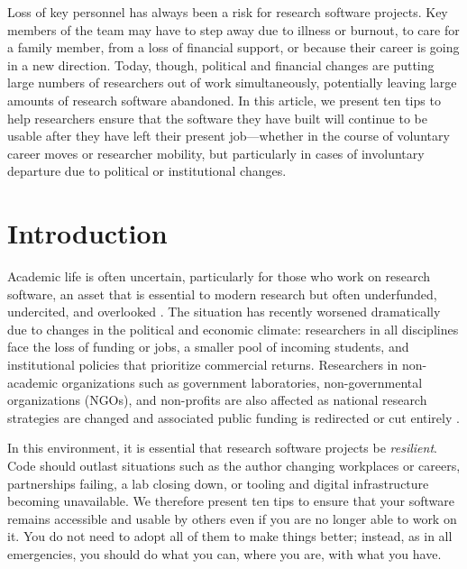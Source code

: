 \documentclass[10pt,letterpaper]{article}
\begin{document}
Loss of key personnel has always been a risk for research software projects.
Key members of the team may have to step away due to illness or burnout,
to care for a family member,
from a loss of financial support,
or because their career is going in a new direction.
Today,
though,
political and financial changes are putting large numbers of researchers out of work simultaneously,
potentially leaving large amounts of research software abandoned.
In this article,
we present ten tips to help researchers ensure that
the software they have built will continue to be usable
after they have left their present job---whether in the course of voluntary career moves or researcher mobility,
but particularly in cases of involuntary departure due to political or institutional changes.

\linenumbers

\section*{Introduction}

Academic life is often uncertain,
particularly for those who work on research software,
an asset that is essential to modern research \cite{Pearson2025}
but often underfunded, undercited, and overlooked \cite{Carver2022}.
The situation has recently worsened dramatically due to changes in the political and economic climate:
researchers in all disciplines face the loss of funding or jobs,
a smaller pool of incoming students,
and institutional policies that prioritize commercial returns.
Researchers in non-academic organizations
such as government laboratories, non-governmental organizations (NGOs), and non-profits are also affected \cite{Woodward2025}
as national research strategies are changed
and associated public funding is redirected or cut entirely \cite{Nature2025}.

In this environment, it is essential that research software projects be \emph{resilient}.
Code should outlast situations such as the author changing workplaces or careers,
partnerships failing,
a lab closing down,
or tooling and digital infrastructure becoming unavailable.
We therefore present ten tips to ensure that your software remains accessible and usable by others
even if you are no longer able to work on it.
You do not need to adopt all of them to make things better;
instead,
as in all emergencies,
you should do what you can,
where you are,
with what you have.
\end{document}
